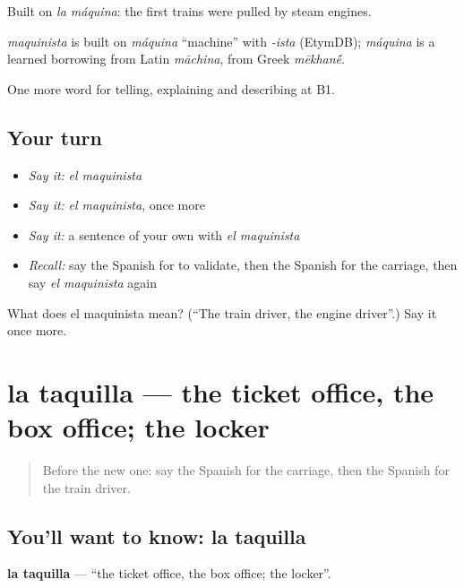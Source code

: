 Built on \emph{la máquina}: the first trains were pulled by steam engines.

\begin{cousinweb}
\emph{maquinista} is built on \emph{máquina} \textquotedblleft{}machine\textquotedblright{} with \emph{-ista} (EtymDB); \emph{máquina} is a learned borrowing from Latin \emph{māchina}, from Greek \emph{mēkhan\'{\={e}}}.
\end{cousinweb}

\begin{grammarlens}[title={What you've built}]
One more word for telling, explaining and describing at B1.
\end{grammarlens}

\subsection*{Your turn}
\begin{itemize}
\raggedright
  \item \emph{Say it:} \emph{el maquinista}
  \item \emph{Say it:} \emph{el maquinista}, once more
  \item \emph{Say it:} a sentence of your own with \emph{el maquinista}
  \item \emph{Recall:} say the Spanish for to validate, then the Spanish for the carriage, then say \emph{el maquinista} again
\end{itemize}

\begin{tcolorbox}[breakable,colback=teal!4,colframe=teal!35!black,title={Before you move on}]
What does el maquinista mean? (\textquotedblleft{}The train driver, the engine driver\textquotedblright{}.) Say it once more.
\end{tcolorbox}
\section[la taquilla]{la taquilla — the ticket office, the box office; the locker}

\label{lesson:ES-C651-taquilla}



\begin{quote}
Before the new one: say the Spanish for the carriage, then the Spanish for the train driver.
\end{quote}

\subsection*{You'll want to know: la taquilla}
\textbf{la taquilla} — \textquotedblleft{}the ticket office, the box office; the locker\textquotedblright{}.

